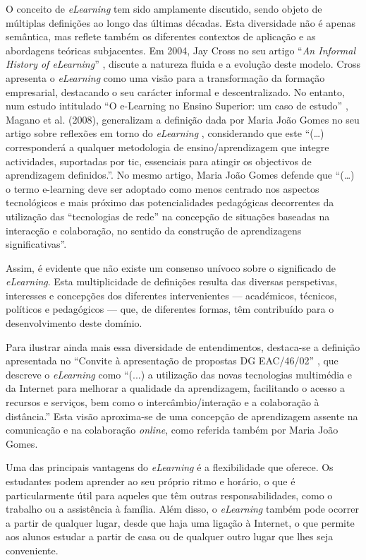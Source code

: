 O conceito de \textit{eLearning} tem sido amplamente discutido, sendo objeto de múltiplas definições ao longo das últimas décadas. Esta diversidade não é apenas semântica, mas reflete também os diferentes contextos de aplicação e as abordagens teóricas subjacentes. Em 2004, Jay Cross no seu artigo ``\textit{An Informal History of eLearning}'' \cite{jaycross}, discute a natureza fluida e a evolução deste modelo. Cross apresenta o \textit{eLearning} como uma visão para a transformação da formação empresarial, destacando o seu carácter informal e descentralizado.  No entanto, num estudo intitulado ``O e-Learning no Ensino Superior: um caso de estudo'' \cite{eLearningenssup}, Magano et al. (2008), generalizam a definição dada por Maria João Gomes no seu artigo sobre reflexões em torno do \textit{eLearning} \cite{gomes_e-learning_2005}, considerando que este ``(\ldots) corresponderá a qualquer metodologia de ensino/aprendizagem que integre actividades, suportadas por \acrshort{tic}, essenciais para atingir os objectivos de aprendizagem definidos.''. No mesmo artigo, Maria João Gomes defende que ``(\ldots) o termo e-learning deve ser adoptado como menos centrado nos aspectos tecnológicos e mais próximo das potencialidades pedagógicas decorrentes da utilização das ``tecnologias de rede'' na concepção de situações baseadas na interacção e colaboração, no sentido da construção de aprendizagens significativas''.

Assim, é evidente que não existe um consenso unívoco sobre o significado de \textit{eLearning}. Esta multiplicidade de definições resulta das diversas perspetivas, interesses e concepções dos diferentes intervenientes — académicos, técnicos, políticos e pedagógicos — que, de diferentes formas, têm contribuído para o desenvolvimento deste domínio.

Para ilustrar ainda mais essa diversidade de entendimentos, destaca-se a definição apresentada no ``Convite à apresentação de propostas DG EAC/46/02'' \cite{comissao197_07}, que descreve o \textit{eLearning} como ``(...) a utilização das novas tecnologias multimédia e da Internet para melhorar a qualidade da aprendizagem, facilitando o acesso a recursos e serviços, bem como o intercâmbio/interação e a colaboração à distância.'' Esta visão aproxima-se de uma concepção de aprendizagem assente na comunicação e na colaboração \textit{online}, como referida também por Maria João Gomes\cite{gomes_e-learning_2005}.

Uma das principais vantagens do \textit{eLearning} é a flexibilidade que oferece. Os estudantes podem aprender ao seu próprio ritmo e horário, o que é particularmente útil para aqueles que têm outras responsabilidades, como o trabalho ou a assistência à família. Além disso, o \textit{eLearning} também pode ocorrer a partir de qualquer lugar, desde que haja uma ligação à Internet, o que permite aos alunos estudar a partir de casa ou de qualquer outro lugar que lhes seja conveniente.

